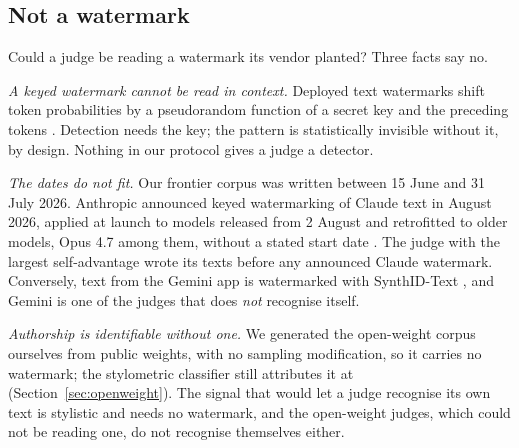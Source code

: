 \subsection{Not a watermark}
\label{sec:watermark}

Could a judge be reading a watermark its vendor planted? Three facts say no.

\emph{A keyed watermark cannot be read in context.} Deployed text watermarks
shift token probabilities by a pseudorandom function of a secret key and the
preceding tokens \citep{kirchenbauer2023watermark, dathathri2024synthid}.
Detection needs the key; the pattern is statistically invisible without it,
by design. Nothing in our protocol gives a judge a detector.

\emph{The dates do not fit.} Our frontier corpus was written between 15 June
and 31 July 2026. Anthropic announced keyed watermarking of Claude text in
August 2026, applied at launch to models released from 2 August and
retrofitted to older models, Opus 4.7 among them, without a stated start date
\citep{anthropic2026watermark, anthropic2026marking}. The judge with the
largest self-advantage wrote its texts before any announced Claude watermark.
Conversely, text from the Gemini app is watermarked with SynthID-Text
\citep{deepmind2026synthid}, and Gemini is one of the judges that does
\emph{not} recognise itself.

\emph{Authorship is identifiable without one.} We generated the open-weight
corpus ourselves from public weights, with no sampling modification, so it
carries no watermark; the stylometric classifier still attributes it at
\OWClfPooled{} (Section~\ref{sec:openweight}). The signal that would let a
judge recognise its own text is stylistic and needs no watermark, and the
open-weight judges, which could not be reading one, do not recognise
themselves either.
